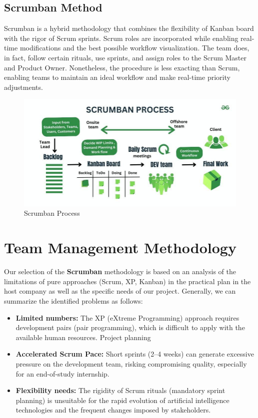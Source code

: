 \subsection{Scrumban Method}
Scrumban is a hybrid methodology that combines the flexibility of Kanban board with the rigor of Scrum sprints. Scrum roles are incorporated while enabling real-time modifications and the best possible workflow visualization. The team does, in fact, follow certain rituals, use sprints, and assign roles to the Scrum Master and Product Owner. Nonetheless, the procedure is less exacting than Scrum, enabling teams to maintain an ideal workflow and make real-time priority adjustments.

\begin{center}
\begin{figure}[H]
            \centering
            \includegraphics[scale=0.55]{images/scrumban.jpg}
            \caption{Scrumban Process }
            \label{fig:Scrumban_Process}
\end{figure}
\end{center}   


\section{Team Management Methodology}
Our selection of the \textbf{Scrumban} methodology is based on an analysis of the limitations of pure approaches (Scrum, XP, Kanban) in the practical plan in the host company as well as the specific needs of our project. Generally, we can summarize the identified problems as follows:
\begin{itemize}
    \item \textbf{Limited numbers:}
    The XP (eXtreme Programming) approach requires development pairs (pair programming), which is difficult to apply with the available human resources.
        Project planning
    \item \textbf{Accelerated Scrum Pace:}
    Short sprints (2–4 weeks) can generate excessive pressure on the development team, risking compromising quality, especially for an end-of-study internship.    
        
    \item \textbf{Flexibility needs:}
    The rigidity of Scrum rituals (mandatory sprint planning) is unsuitable for the rapid evolution of artificial intelligence technologies and the frequent changes imposed by stakeholders.
    \end{itemize}
    
